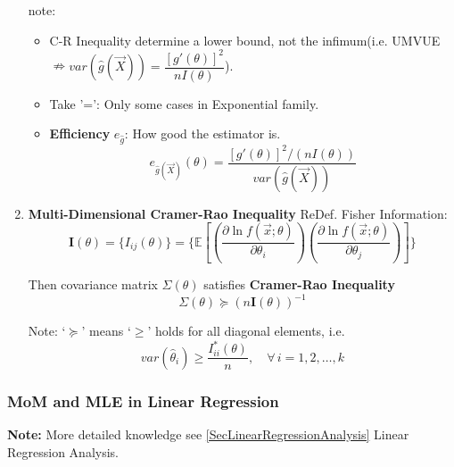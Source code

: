 \begin{enumerate}[topsep=2pt,itemsep=0pt]
        note:
        \begin{itemize}
            \item C-R Inequality determine a lower bound, not the infimum(i.e. UMVUE$\nRightarrow var(\hat{g}(\vec{X}))=\dfrac{[g'(\theta)]^2}{nI(\theta)}$).
            \item Take '=': Only some cases in Exponential family.
            \item \textbf{Efficiency} $ e_{\hat{g}} $: How good the estimator is.
            \begin{equation}
                e_{\hat{g}(\vec{X})}(\theta)=   \frac{[g'(\theta)]^2/(nI(\theta))}{var(\hat{g}(\vec{X}))} 
            \end{equation} 
        \end{itemize}


    \item \textbf{Multi-Dimensional Cramer-Rao Inequality}
        ReDef. Fisher Information:
        \begin{equation}
            \bm{I}(\theta)=\{I_{ij}(\theta)\}=\{\mathbb{E}\left[\left(\frac{\partial\ln f(\vec{x};\theta)}{\partial\theta_i}\right)\left(\frac{\partial\ln f(\vec{x};\theta)}{\partial\theta_j}\right)\right]\}  
        \end{equation}

        Then covariance matrix $\Sigma(\theta)$ satisfies \textbf{Cramer-Rao Inequality}
        \begin{equation}
            \Sigma(\theta)\succeq  (n\bm{I}(\theta))^{-1}
        \end{equation}

        Note: `$\succeq $' means `$ \geq $' holds for all diagonal elements, i.e.
    \begin{equation}
        var(\hat{\theta}_i)\geq \frac{I^*_{ii}(\theta)}{n},\quad \forall\,i=1,2,\ldots,k  
    \end{equation}


        
    \end{enumerate}






\subsubsection{MoM and MLE in Linear Regression}\label{SubSectionMoM_MLE_LinearRegression}
    \textbf{Note:} More detailed knowledge see \autoref{SecLinearRegressionAnalysis} Linear Regression Analysis.

